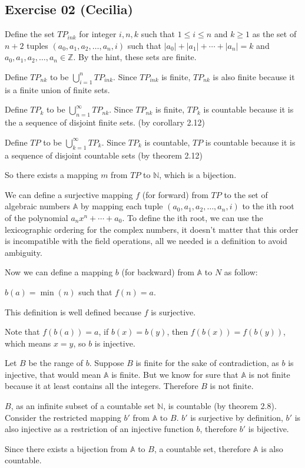 \subsection*{Exercise 02 (Cecilia)}
Define the set $ TP_{ink} $ for integer $ i, n, k $ such that $ 1 \leq i \leq n $ and $ k \ge 1 $ as the set of $ n + 2 $ tuples $ (a_0, a_1, a_2, \dots, a_n, i) $ such that $ |a_0| + |a_1| + \cdots + |a_n| = k $ and $ a_0, a_1, a_2, \dots, a_n \in \mathbb{Z} $. By the hint, these sets are finite.

Define $ TP_{nk} $ to be $ \bigcup\limits_{i=1}^n TP_{ink} $. Since $ TP_{ink} $ is finite, $ TP_{nk} $ is also finite because it is a finite union of finite sets.

Define $ TP_k $ to be $ \bigcup\limits_{n=1}^\infty TP_{nk} $. Since $ TP_{nk} $ is finite, $ TP_k $ is countable because it is the a sequence of disjoint finite sets. (by corollary 2.12)

Define $ TP $ to be $ \bigcup\limits_{k=1}^\infty TP_k $. Since $ TP_k $ is countable, $ TP $ is countable because it is a sequence of disjoint countable sets (by theorem 2.12)

So there exists a mapping $ m $ from $ TP $ to $ \mathbb{N} $, which is a bijection.

We can define a surjective mapping $ f $ (for forward) from $ TP $ to the set of algebraic numbers $ \mathbb{A} $ by mapping each tuple $ (a_0, a_1, a_2, \dots, a_n, i) $ to the ith root of the polynomial $ a_nx^n + \cdots + a_0 $. To define the ith root, we can use the lexicographic ordering for the complex numbers, it doesn't matter that this order is incompatible with the field operations, all we needed is a definition to avoid ambiguity.

Now we can define a mapping $ b $ (for backward) from $ \mathbb{A} $ to $ N $ as follow:

$ b(a) = \min(n) $  such that $ f(n) = a $.

This definition is well defined because $ f $ is surjective.

Note that $ f(b(a)) = a $, if $ b(x) = b(y) $, then $ f(b(x)) = f(b(y)) $, which means $ x = y $, so $ b $ is injective.

Let $ B $ be the range of $ b $. Suppose $ B $ is finite for the sake of contradiction, as $ b $ is injective, that would mean $ \mathbb{A} $ is finite. But we know for sure that $ \mathbb{A} $ is not finite because it at least contains all the integers. Therefore $ B $ is not finite.

$ B $, as an infinite subset of a countable set $ \mathbb{N} $, is countable (by theorem 2.8). Consider the restricted mapping $ b' $ from $ \mathbb{A} $ to $ B $. $ b' $ is surjective by definition, $ b' $ is also injective as a restriction of an injective function $ b $, therefore $ b' $ is bijective.

Since there exists a bijection from $ \mathbb{A} $ to $ B $, a countable set, therefore $ \mathbb{A} $ is also countable.